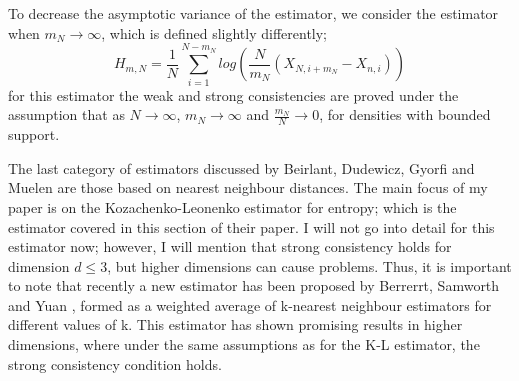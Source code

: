 \documentclass{article}
\begin{document}
To decrease the asymptotic variance of the estimator, we consider the estimator when $m_{N} \to \infty$, which is defined slightly differently;
\begin{equation}
H_{m, N} = \frac{1}{N} \sum_{i=1}^{N-m_{N}} log \left(\frac{N}{m_{N}} (X_{N, i+m_{N}} - X_{n, i}) \right)
\end{equation}
for this estimator the weak and strong consistencies are proved under the assumption that as $N \to \infty$, $m_{N} \to \infty$ and $\frac{m_{N}}{N} \to 0$, for densities with bounded support.

The last category of estimators discussed by Beirlant, Dudewicz, Gyorfi and Muelen are those based on nearest neighbour distances. The main focus of my paper is on the Kozachenko-Leonenko estimator for entropy; which is the estimator covered in this section of their paper. I will not go into detail for this estimator now; however, I will mention that strong consistency holds for dimension $d \leq 3$, but higher dimensions can cause problems. Thus, it is important to note that recently a new estimator has been proposed by Berrerrt, Samworth and Yuan \cite{paper4}, formed as a weighted average of k-nearest neighbour estimators for different values of k. This estimator has shown promising results in higher dimensions, where under the same assumptions as for the K-L estimator, the strong consistency condition holds.
\end{document}
